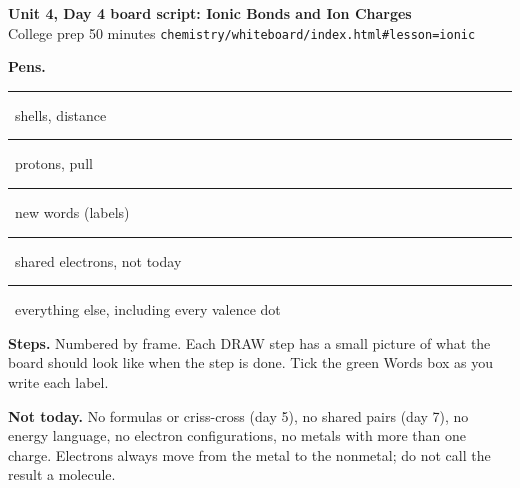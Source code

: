 \documentclass[10.5pt]{article}
\newcommand{\pen}[2]{\textcolor{#1}{\rule{8pt}{8pt}}\ #2}
\begin{document}
\begin{center}{\Large\bfseries Unit 4, Day 4 board script: Ionic Bonds and Ion Charges}\\[2pt]{\normalsize College prep \textbullet{} 50 minutes \textbullet{} \texttt{chemistry/whiteboard/index.html\#lesson=ionic}}\end{center}
\noindent\textbf{Pens.} \pen{pblue}{shells, distance} \quad \pen{pred}{protons, pull} \quad \pen{pgreen}{new words (labels)} \quad \pen{ppurple}{shared electrons, not today} \quad \pen{black}{everything else, including every valence dot}\par
\noindent\textbf{Steps.} Numbered by frame. Each DRAW step has a small picture of what the board should look like when the step is done. Tick the green Words box as you write each label.\par
\noindent\textbf{Not today.} No formulas or criss-cross (day 5), no shared pairs (day 7), no energy language, no electron configurations, no metals with more than one charge. Electrons always move from the metal to the nonmetal; do not call the result a molecule.\par\smallskip
\noindent{}\par\medskip
\end{document}
